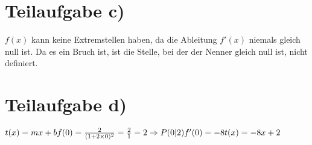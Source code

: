 \documentclass[11pt, a4paper]{report}
\begin{document}
	\section{Teilaufgabe c)}
	$f(x)$ kann keine Extremstellen haben, da die Ableitung $f'(x)$ niemals gleich null ist.
	Da es ein Bruch ist, ist die Stelle, bei der der Nenner gleich null ist, nicht definiert.
	
	\section{Teilaufgabe d)}
	$
	t(x) = mx + b \\
	f(0) = \frac{2}{(1+2 \times 0)^2} = \frac{2}{1} = 2 \\
	\Rightarrow P(0|2) \\
	f'(0) = -8 \\
	t(x) = -8x + 2
	$
	

	
\end{document}
